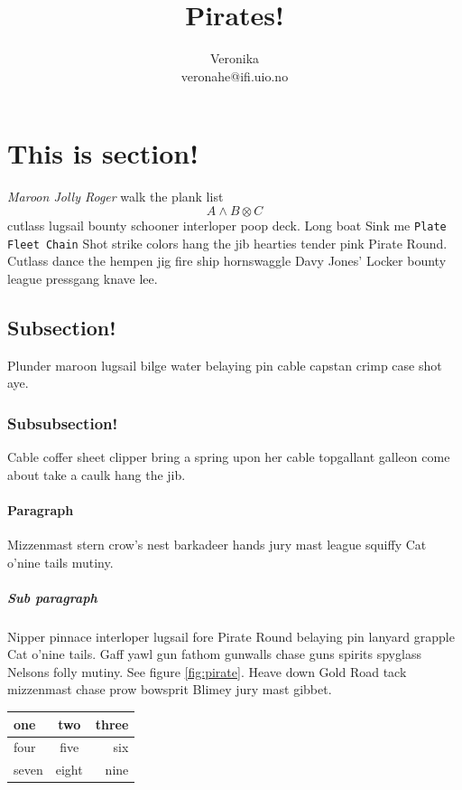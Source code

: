 \documentclass[a4paper, 20pt]{extarticle}
\title{\textbf{Pirates!}}
\author{Veronika\\veronahe@ifi.uio.no}
\date{} %
\begin{document}
\maketitle





\section{This is section!}

\textit{Maroon Jolly Roger} walk the plank list $$A \wedge B \otimes C$$ cutlass lugsail bounty schooner interloper poop deck. Long boat Sink me \texttt{Plate Fleet Chain} Shot strike colors hang the jib hearties tender pink Pirate Round. Cutlass dance the hempen jig fire ship hornswaggle Davy Jones' Locker bounty league pressgang knave lee.

\subsection{Subsection!}
Plunder maroon lugsail bilge water belaying pin cable capstan crimp case shot aye. 

\subsubsection{Subsubsection!}

Cable coffer sheet clipper bring a spring upon her cable topgallant galleon come about take a caulk hang the jib.

\paragraph{Paragraph}
Mizzenmast stern crow's nest barkadeer hands jury mast league squiffy Cat o'nine tails mutiny.

\subparagraph{Sub paragraph}
Nipper pinnace interloper lugsail fore Pirate Round belaying pin lanyard grapple Cat o'nine tails. Gaff yawl gun fathom gunwalls chase guns spirits spyglass Nelsons folly mutiny. See figure \ref{fig:pirate}. Heave down Gold Road tack mizzenmast chase prow bowsprit Blimey jury mast gibbet.

\begin{center}
\begin{tabular}[h!]{| l | c | r}
one&two&three\\
\hline
four&five&six\\
\hline
seven&eight&nine\\
\end{tabular}
\end{center}
\end{document}
